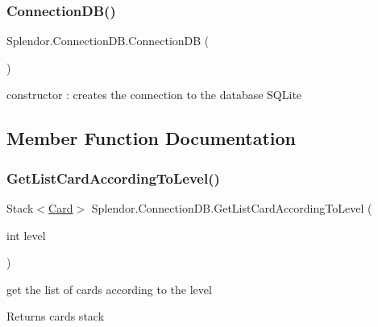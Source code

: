 \subsubsection{\texorpdfstring{Connection\+D\+B()}{ConnectionDB()}}
{\footnotesize\ttfamily Splendor.\+Connection\+D\+B.\+Connection\+DB (\begin{DoxyParamCaption}{ }\end{DoxyParamCaption})}



constructor \+: creates the connection to the database S\+Q\+Lite 



\subsection{Member Function Documentation}
\mbox{\label{class_splendor_1_1_connection_d_b_abcd995d0fa97aa5f3a40ff5c23b22502}} 
\subsubsection{\texorpdfstring{Get\+List\+Card\+According\+To\+Level()}{GetListCardAccordingToLevel()}}
{\footnotesize\ttfamily Stack$<$\mbox{\hyperlink{class_splendor_1_1_card}{Card}}$>$ Splendor.\+Connection\+D\+B.\+Get\+List\+Card\+According\+To\+Level (\begin{DoxyParamCaption}\item[{int}]{level }\end{DoxyParamCaption})}



get the list of cards according to the level 

\begin{DoxyReturn}{Returns}
cards stack
\end{DoxyReturn}
\mbox{\label{class_splendor_1_1_connection_d_b_a7d715d5452049ad06f4a407fa5df151c}} 
